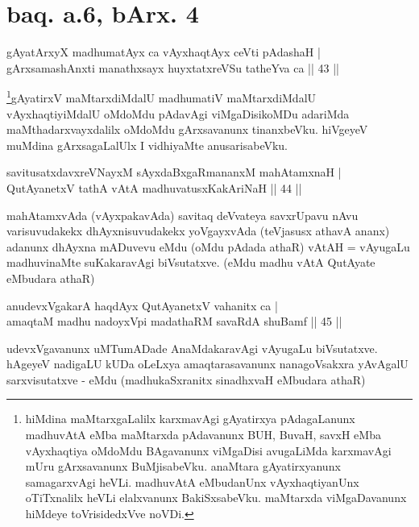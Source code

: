 \section*{baq. a.6, bArx. 4}

\begin{shl}
gAyatArxyX madhumatAyx ca vAyxhaqtAyx ceVti pAdashaH | \\
gArxsamashAnxti manathxsayx huyxtatxreVSu tatheYva ca \hfill|| 43 || 
\end{shl}

\begin{artha}
\footnote[1]{hiMdina maMtarxgaLalilx karxmavAgi gAyatirxya 
pAdagaLanunx madhuvAtA eMba maMtarxda pAdavanunx BUH, BuvaH, savxH 
eMba vAyxhaqtiya oMdoMdu BAgavanunx viMgaDisi avugaLiMda karxmavAgi 
mUru gArxsavanunx BuMjisabeVku. anaMtara gAyatirxyanunx samagarxvAgi 
heVLi. madhuvAtA eMbudanUnx vAyxhaqtiyanUnx oTiTxnalilx heVLi 
elalxvanunx BakiSxsabeVku. maMtarxda viMgaDavanunx hiMdeye 
toVrisidedxVve noVDi.}gAyatirxV maMtarxdiMdalU madhumatiV maMtarxdiMdalU 
vAyxhaqtiyiMdalU oMdoMdu pAdavAgi viMgaDisikoMDu adariMda 
maMthadarxvayxdalilx oMdoMdu gArxsavanunx tinanxbeVku. hiVgeyeV muMdina 
gArxsagaLalUlx I vidhiyaMte anusarisabeVku.
\end{artha}


\begin{shl}
savitusatxdavxreVNayxM sAyxdaBxgaRmananxM mahAtamxnaH | \\
QutAyanetxV tathA vAtA madhuvatusxKakAriNaH \hfill|| 44 || 
\end{shl}

\begin{artha}
mahAtamxvAda (vAyxpakavAda) savitaq deVvateya savxrUpavu nAvu 
varisuvudakekx dhAyxnisuvudakekx yoVgayxvAda (teVjasusx athavA ananx) 
adanunx dhAyxna mADuvevu eMdu (oMdu pAdada athaR) vAtAH = vAyugaLu 
madhuvinaMte suKakaravAgi biVsutatxve. (eMdu madhu vAtA QutAyate 
eMbudara athaR)
\end{artha}


\begin{shl}
anudevxVgakarA haqdAyx QutAyanetxV vahanitx ca | \\
amaqtaM madhu nadoyxV\s pi madathaRM savaRdA shuBamf \hfill|| 45 || 
\end{shl}

\begin{artha}
udevxVgavanunx uMTumADade AnaMdakaravAgi vAyugaLu biVsutatxve. hAgeyeV 
nadigaLU kUDa oLeLxya amaqtarasavanunx nanagoVsakxra yAvAgalU 
sarxvisutatxve - eMdu (madhukaSxranitx sinadhxvaH eMbudara athaR)
\end{artha}

